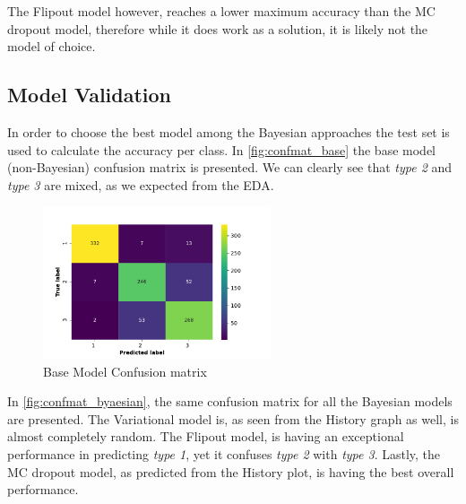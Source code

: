 \documentclass[11pt,twoside]{article}
\numberwithin{Theorem}{section}
\numberwithin{Definition}{section}
\numberwithin{Lemma}{section}
\numberwithin{Algorithm}{section}
\numberwithin{equation}{section}
\begin{document}
The Flipout model however, reaches a lower maximum accuracy than the MC dropout model, therefore while it does work as a solution, it is likely not the model of choice. 


\subsection{Model Validation}
\label{sec:validation}
In order to choose the best model among the Bayesian approaches the test set is used to calculate the accuracy per class. In \autoref{fig:confmat_base} the base model (non-Bayesian) confusion matrix is presented. We can clearly see that \textit{type 2} and \textit{type 3} are mixed, as we expected from the EDA.

\vspace*{1em}
\begin{figure}[!h]
\centering
\includegraphics[width=0.6\textwidth]{./output/2.e.confmat-base.pdf}
\caption{Base Model Confusion matrix}
\label{fig:confmat_base}
\end{figure}
\vspace{2em}

In \autoref{fig:confmat_byaesian}, the same confusion matrix for all the Bayesian models are presented. The Variational model is, as seen from the History graph as well, is almost completely random. The Flipout model, is having an exceptional performance in predicting \textit{type 1}, yet it confuses \textit{type 2} with \textit{type 3}. Lastly, the MC dropout model, as predicted from the History plot, is having the best overall performance. 
\end{document}

